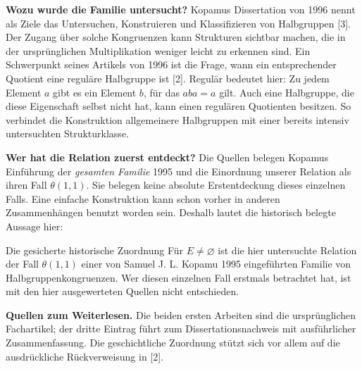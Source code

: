 \documentclass[a4paper,11pt,oneside]{report}
\begin{document}
\textbf{Wozu wurde die Familie untersucht?}
Kopamus Dissertation von 1996 nennt als Ziele das Untersuchen,
Konstruieren und Klassifizieren von Halbgruppen [3]. Der Zugang über
solche Kongruenzen kann Strukturen sichtbar machen, die in der
ursprünglichen Multiplikation weniger leicht zu erkennen sind.
Ein Schwerpunkt seines Artikels von 1996 ist die Frage, wann ein
entsprechender Quotient eine reguläre Halbgruppe ist [2].
Regulär bedeutet hier: Zu jedem Element \(a\) gibt es ein Element
\(b\), für das \(aba=a\) gilt. Auch eine Halbgruppe, die diese
Eigenschaft selbst nicht hat, kann einen regulären Quotienten besitzen.
So verbindet die Konstruktion allgemeinere Halbgruppen mit einer
bereits intensiv untersuchten Strukturklasse.

\textbf{Wer hat die Relation zuerst entdeckt?}
Die Quellen belegen Kopamus Einführung der \emph{gesamten Familie}
1995 und die Einordnung unserer Relation als ihren Fall
\(\theta(1,1)\). Sie belegen keine absolute Erstentdeckung dieses
einzelnen Falls. Eine einfache Konstruktion kann schon vorher in
anderen Zusammenhängen benutzt worden sein. Deshalb lautet die
historisch belegte Aussage hier:

\begin{Lesebeispiel}{Die gesicherte historische Zuordnung}
Für \(E\ne\varnothing\) ist die hier untersuchte Relation der Fall
\(\theta(1,1)\) einer von Samuel J. L. Kopamu 1995 eingeführten
Familie von Halbgruppenkongruenzen. Wer diesen einzelnen Fall erstmals
betrachtet hat, ist mit den hier ausgewerteten Quellen nicht entschieden.
\end{Lesebeispiel}

\textbf{Quellen zum Weiterlesen.}
Die beiden ersten Arbeiten sind die ursprünglichen Fachartikel;
der dritte Eintrag führt zum Dissertationsnachweis mit ausführlicher
Zusammenfassung. Die geschichtliche Zuordnung stützt sich vor allem
auf die ausdrückliche Rückverweisung in [2].
\end{document}
